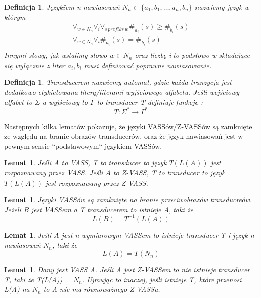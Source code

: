 \documentclass[magisterska]{pracamgr}
\newtheorem{lemma}[theorem]{Lemat}
\newtheorem{definition}[theorem]{Definicja}
\begin{document}
    \begin{definition}
        Językiem n-nawiasowań $N_n \subset \{a_1,b_1, \dots , a_n, b_n\}$ nazwiemy język w którym
        \begin{gather*}
            \forall_{w \in N_n} \forall_i \forall_{s \, prefiks \,w} \#_{a_i}(s) \geq \#_{b_i}(s)\\
            \forall_{w \in N_n} \forall_i \#_{a_i}(s) = \#_{b_i}(s)\\
        \end{gather*}
        Innymi słowy, jak ustalimy słowo $w \in N_n$ oraz liczbę i to podsłowo w składające się wyłącznie z liter $a_i,b_i$ musi definiować poprawne nawiasowanie.
    \end{definition}


    \begin{definition}
        Transducerem nazwiemy automat,  gdzie każda tranzycja
        jest dodatkowo etykietowana literą/literami wyjściowego alfabetu.
        Jeśli wejściowy alfabet to $\Sigma$ a wyjściowy to $\Gamma$ to transducer T definiuje funkcje :
        \[T:\Sigma ^* \rightarrow \Gamma ^*\]
    \end{definition}

    Następnych kilka lematów\cite{toolbox} pokazuje, że języki VASSów/Z-VASSów są zamknięte ze względu na branie obrazów transducerów,
    oraz że język nawiasowań jest w pewnym sensie ``podstawowym`` językiem VASSów.

    \begin{lemma}
        \label{transducer_im}
        Jeśli $A$ to VASS, T to transducer to język $T(L(A))$ jest rozpoznawany przez VASS.
        Jeśli $A$ to Z-VASS, T to transducer to język $T(L(A))$ jest rozpoznawany przez Z-VASS.
    \end{lemma}

    \begin{lemma}
        \label{transducer_rev_im}
        Języki VASSów są zamknięte na branie przeciwobrazów transducreów.
        Jeżeli B jest VASSem a T transducerem to istnieje A, taki że
        \[L(B) = T^{-1}(L(A))\]
    \end{lemma}

    \begin{lemma}
        Jeśli $A$ jest n wymiarowym VASSem to istnieje transducer T i język n-nawiasowań $N_n$, taki że
        \[L(A) = T(N_n)\]
    \end{lemma}

    \begin{lemma}
        Dany jest VASS A.
        Jeśli A jest Z-VASSem to nie istnieje transducer T, taki że T(L(A)) = $N_n$.
        Ujmując to inaczej, jeśli istnieje T, które przenosi L(A) na $N_n$ to A nie ma równoważnego Z-VASSu.
    \end{lemma}
\end{document}
